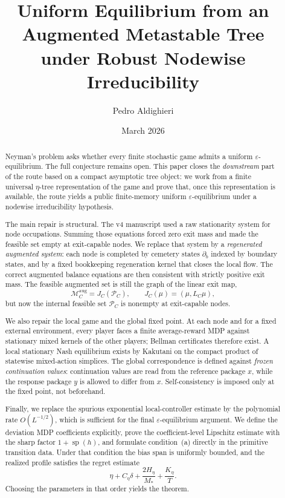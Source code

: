 \documentclass[12pt]{article}
\title{\textbf{Uniform Equilibrium from an Augmented Metastable Tree\\under Robust Nodewise Irreducibility}}
\author{Pedro Aldighieri}
\date{March 2026}
\theoremstyle{definition}
\newcommand{\eps}{\varepsilon}
\newcommand{\1}{\mathbf{1}}
\newcommand{\cM}{\mathcal{M}}
\newcommand{\cP}{\mathcal{P}}
\DeclareMathOperator{\spn}{sp}
\begin{document}
\maketitle

\begin{abstract}
Neyman's problem asks whether every finite stochastic game admits a uniform
$\eps$-equilibrium.  The full conjecture remains open.  This paper closes the
\emph{downstream} part of the route based on a compact asymptotic tree object:
we work from a finite universal $\eta$-tree representation of the game and prove
that, once this representation is available, the route yields a public
finite-memory uniform $\eps$-equilibrium under a nodewise irreducibility
hypothesis.

The main repair is structural.  The v4 manuscript used a raw stationarity system
for node occupations.  Summing those equations forced zero exit mass and made the
feasible set empty at exit-capable nodes.  We replace that system by a
\emph{regenerated augmented system}: each node is completed by cemetery states
$\partial_b$ indexed by boundary states, and by a fixed bookkeeping regeneration
kernel that closes the local flow.  The correct augmented balance equations are
then consistent with strictly positive exit mass.  The feasible augmented set is
still the graph of the linear exit map,
\[
\cM_C^{\mathrm{aug}} = J_C(\cP_C),\qquad J_C(\mu)=(\mu,L_C\mu),
\]
but now the internal feasible set $\cP_C$ is nonempty at exit-capable nodes.

We also repair the local game and the global fixed point.  At each node and for a
fixed external environment, every player faces a finite average-reward MDP against
stationary mixed kernels of the other players; Bellman certificates therefore
exist.  A local stationary Nash equilibrium exists by Kakutani on the compact
product of statewise mixed-action simplices.  The global correspondence is defined
against \emph{frozen continuation values}: continuation values are read from the
reference package $x$, while the response package $y$ is allowed to differ from
$x$.  Self-consistency is imposed only at the fixed point, not beforehand.

Finally, we replace the spurious exponential local-controller estimate by the
polynomial rate $O(L^{-1/2})$, which is sufficient for the final
$\eps$-equilibrium argument.  We define the deviation MDP coefficients explicitly,
prove the coefficient-level Lipschitz estimate with the sharp factor
$1+\spn(h)$, and formulate condition~\textnormal{(a)} directly in the primitive
transition data.  Under that condition the bias span is uniformly bounded, and
the realized profile satisfies the regret estimate
\[
\eta + C_\eta\delta + \frac{2H_\eta}{M_*} + \frac{K_\eta}{T}.
\]
Choosing the parameters in that order yields the theorem.
\end{abstract}
\end{document}
